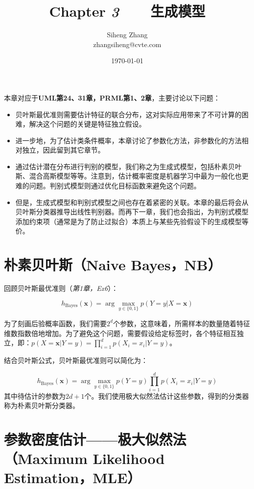 \documentclass{article}
\author{Siheng Zhang\\zhangsiheng@cvte.com}
\title{Chapter \textbf{\textit{3}}\ \ \ \ 生成模型}
\date{\today}
\begin{document}
\maketitle  

本章对应于\textbf{UML第24、31章，PRML第1、2章}，主要讨论以下问题：

\begin{itemize}
\item 贝叶斯最优准则需要估计特征的联合分布，这对实际应用带来了不可计算的困难，解决这个问题的关键是特征独立假设。
\item 进一步地，为了估计类条件概率，本章讨论了参数化方法，非参数化的方法相对独立，因此留到其它章节。
\item 通过估计潜在分布进行判别的模型，我们称之为生成式模型，包括朴素贝叶斯、混合高斯模型等等。注意到，估计概率密度是机器学习中最为一般化也更难的问题。判别式模型则通过优化目标函数来避免这个问题。
\item 但是，生成式模型和判别式模型之间也存在着紧密的关联。本章的最后将会从贝叶斯分类器推导出线性判别器。而再下一章，我们也会指出，为判别式模型添加约束项（通常是为了防止过拟合）本质上与某些先验假设下的生成模型等价。
\end{itemize}

\tableofcontents
\newpage

\section{朴素贝叶斯（Naive Bayes，NB）}

	回顾贝叶斯最优准则（\textit{第1章，Ex6}）：
	
	\begin{equation*}
	h_{\mathrm{Bayes}}(\bm{x}) = \arg\max\limits_{y\in\{0,1\}} p (Y=y|X=\bm{x})
	\end{equation*}
	
	为了刻画后验概率函数，我们需要$2^d$个参数，这意味着，所需样本的数量随着特征维数指数倍地增加。为了避免这个问题，需要假设给定标签时，各个特征相互独立，即：$p (X=\bm{x}|Y=y) = \prod_{i=1}^d p (X_i=x_i|Y=y)$。

	结合贝叶斯公式，贝叶斯最优准则可以简化为：
	
	\begin{equation}
	h_{\mathrm{Bayes}}(\bm{x}) = \arg\max\limits_{y\in\{0,1\}} p (Y=y) \prod_{i=1}^d p (X_i=x_i|Y=y)
	\end{equation}
其中待估计的参数为$2d + 1$个。我们使用极大似然法估计这些参数，得到的分类器称为朴素贝叶斯分类器。

\section{参数密度估计——极大似然法（Maximum Likelihood Estimation，MLE）}
	
\end{document}

